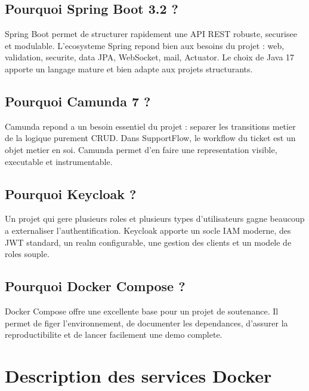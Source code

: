 \subsection{Pourquoi Spring Boot 3.2 ?}

Spring Boot permet de structurer rapidement une API REST robuste, securisee et modulable. L'ecosysteme Spring repond bien aux besoins du projet : web, validation, securite, data JPA, WebSocket, mail, Actuator. Le choix de Java 17 apporte un langage mature et bien adapte aux projets structurants.

\subsection{Pourquoi Camunda 7 ?}

Camunda repond a un besoin essentiel du projet : separer les transitions metier de la logique purement CRUD. Dans SupportFlow, le workflow du ticket est un objet metier en soi. Camunda permet d'en faire une representation visible, executable et instrumentable.

\subsection{Pourquoi Keycloak ?}

Un projet qui gere plusieurs roles et plusieurs types d'utilisateurs gagne beaucoup a externaliser l'authentification. Keycloak apporte un socle IAM moderne, des JWT standard, un realm configurable, une gestion des clients et un modele de roles souple.

\subsection{Pourquoi Docker Compose ?}

Docker Compose offre une excellente base pour un projet de soutenance. Il permet de figer l'environnement, de documenter les dependances, d'assurer la reproductibilite et de lancer facilement une demo complete.

\section{Description des services Docker}

